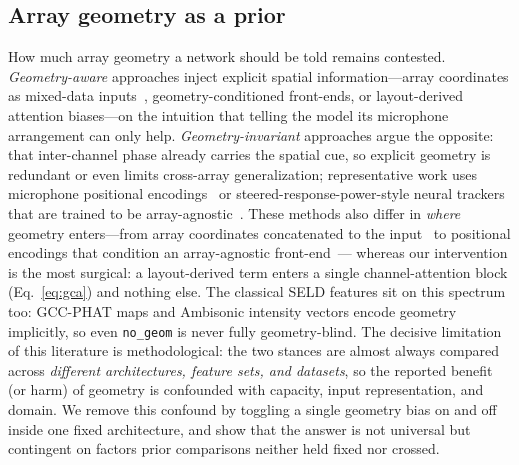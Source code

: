 \subsection{Array geometry as a prior}
How much array geometry a network should be told remains contested.
\emph{Geometry-aware} approaches inject explicit spatial information---array
coordinates as mixed-data inputs~\cite{kowalk2022geometry}, geometry-conditioned
front-ends, or layout-derived attention biases---on the intuition that telling
the model its microphone arrangement can only help. \emph{Geometry-invariant}
approaches argue the opposite: that inter-channel phase already carries the
spatial cue, so explicit geometry is redundant or even limits cross-array
generalization; representative work uses microphone positional
encodings~\cite{baek2025gidoaenet} or steered-response-power-style neural
trackers that are trained to be array-agnostic~\cite{neuralsrp2024}. These
methods also differ in \emph{where} geometry enters---from array coordinates
concatenated to the input~\cite{kowalk2022geometry} to positional encodings that
condition an array-agnostic front-end~\cite{baek2025gidoaenet,neuralsrp2024}---
whereas our intervention is the most surgical: a layout-derived term enters a
single channel-attention block (Eq.~\eqref{eq:gca}) and nothing else. The
classical SELD features sit on this spectrum too: GCC-PHAT maps and Ambisonic
intensity vectors encode geometry implicitly, so even \texttt{no\_geom} is never
fully geometry-blind. The decisive
limitation of this literature is methodological: the two stances are almost
always compared across
\emph{different architectures, feature sets, and datasets}, so the reported
benefit (or harm) of geometry is confounded with capacity, input representation,
and domain. We remove this confound by toggling a single geometry bias on and
off inside one fixed architecture, and show that the answer is not universal but
contingent on factors prior comparisons neither held fixed nor crossed.

